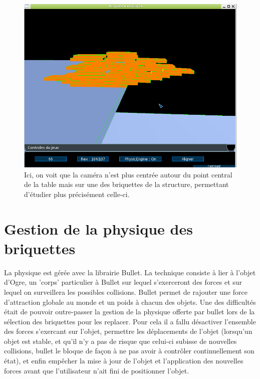\documentclass[frenchb,twoside]{EPURapport}
\begin{document}
    \begin{figure}[h]
		\centering
        \includegraphics[width=12cm]{images/bon_score.png}
        \caption{\label{fig:bon_score}Ici, on voit que la caméra n'est plus
        centrée autour du point
        central de la table mais sur une des briquettes de la structure,
        permettant d'étudier plus précisément celle-ci.}
    \end{figure}

    \section{Gestion de la physique des briquettes}
        La physique est gérée avec la librairie Bullet. La technique consiste à
        lier à l'objet d'Ogre, un 'corps' particulier à Bullet sur lequel
        s'exerceront des forces et sur lequel on surveillera les possibles
        collisions. Bullet permet de rajouter une force d'attraction globale au
        monde et un poids à chacun des objets. Une des difficultés était de
        pouvoir outre-passer la gestion de la physique offerte par bullet lors
        de la sélection des briquettes pour les replacer. Pour cela il a fallu
        désactiver l'ensemble des forces s'exercant sur l'objet, permettre les
        déplacements de l'objet (lorsqu'un objet est stable, et qu'il n'y a pas
        de risque que celui-ci subisse de nouvelles collisions, bullet le bloque
        de façon à ne pas avoir à contrôler continuellement son état), et enfin
        empêcher la mise à jour de l'objet et l'application des nouvelles
        forces avant que l'utilisateur n'ait fini de positionner l'objet. 
\end{document}
